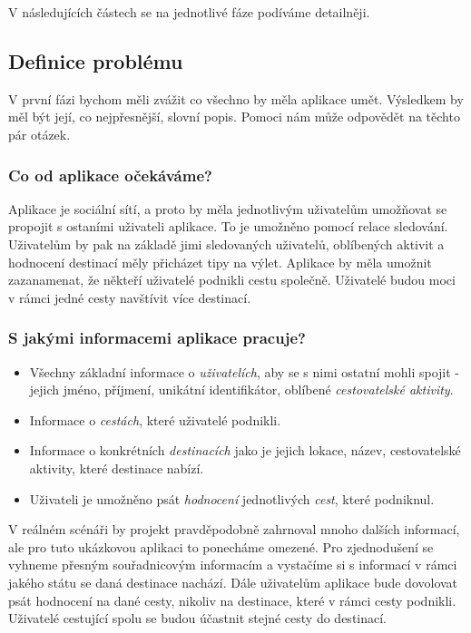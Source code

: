 \documentclass[
  program=infoi,
  biblatex=true,
  sourcecodes=true,
  figures=true,
  glossaries=false,
  index
]{kidiplom}
\begin{document}
V následujících částech se na jednotlivé fáze podíváme detailněji. 

\subsection{Definice problému}
V první fázi bychom měli zvážit co všechno by měla aplikace umět. Výsledkem by měl být její, co nejpřesnější, slovní popis. Pomoci nám může odpovědět na těchto pár otázek.

\subsubsection{Co od aplikace očekáváme?}
Aplikace je sociální sítí, a proto by měla jednotlivým uživatelům umožňovat se propojit s ostaními uživateli aplikace. To je umožněno pomocí relace sledování. Uživatelům by pak na základě jimi sledovaných uživatelů, oblíbených aktivit a hodnocení destinací měly přicházet tipy na výlet. Aplikace by měla umožnit zazanamenat, že někteří uživatelé podnikli cestu společně. Uživatelé budou moci v rámci jedné cesty navštívit více destinací.

\subsubsection{S jakými informacemi aplikace pracuje?}
\begin{itemize}
  \item Všechny základní informace o \textit{uživatelích}, aby se s nimi ostatní mohli spojit - jejich jméno, příjmení, unikátní identifikátor, oblíbené \textit{cestovatelské aktivity}.
  \item Informace o \textit{cestách}, které uživatelé podnikli.
  \item Informace o konkrétních \textit{destinacích} jako je jejich lokace, název, cestovatelské aktivity, které destinace nabízí.
  \item Uživateli je umožněno psát \textit{hodnocení} jednotlivých \textit{cest}, které podniknul.
\end{itemize}
V reálném scénáři by projekt pravděpodobně zahrnoval mnoho dalších informací, ale pro tuto ukázkovou aplikaci to ponecháme omezené. Pro zjednodušení se vyhneme přesným souřadnicovým informacím a vystačíme si s informací v rámci jakého státu se daná destinace nachází. Dále uživatelům aplikace bude dovolovat psát hodnocení na dané cesty, nikoliv na destinace, které v rámci cesty podnikli. Uživatelé cestující spolu se budou účastnit stejné cesty do destinací. 
\end{document}

